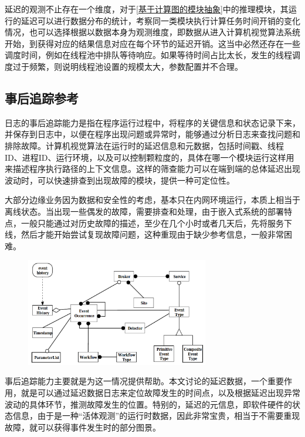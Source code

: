 \documentclass[master]{shtthesis}
\begin{document}
延迟的观测不止存在一个维度，对于\ref{基于计算图的模块抽象}中的推理模块，其运行的延迟可以进行数据分布的统计，考察同一类模块执行计算任务时间开销的变化情况，也可以选择根据以数据本身为观测维度，即数据从进入计算机视觉算法系统开始，到获得对应的结果信息对应在每个环节的延迟开销。这当中必然还存在一些调度时间，例如在线程池中排队等待响应。如果等待时间占比太长，发生的线程调度过于频繁，则说明线程池设置的规模太大，参数配置并不合理。

\subsection{事后追踪参考}\label{事后追踪参考}
日志的事后追踪能力是指在程序运行过程中，将程序的关键信息和状态记录下来，并保存到日志中，以便在程序出现问题或异常时，能够通过分析日志来查找问题和排除故障。计算机视觉算法在运行时的延迟信息和元数据，包括时间戳、线程ID、进程ID、运行环境，以及可以控制颗粒度的，具体在哪一个模块运行这样用来描述程序执行路径的上下文信息。这样的筛查能力可以在端到端的总体延迟出现波动时，可以快速排查到出现故障的模块，提供一种可定位性。

大部分边缘业务因为数据和安全性的考虑，基本只在内网环境运行，本质上相当于离线状态。当出现一些偶发的故障，需要排查和处理，由于嵌入式系统的部署特点，一般只能通过对历史故障的描述，至少在几个小时或者几天后，先将服务下线，然后才能开始尝试复现故障问题，这种重现由于缺少参考信息，一般非常困难。

\begin{figure}[htbp]
	\centering
	\includegraphics[width=8cm]{img/eve.png}
	\label{一种日志事件跟踪的设计方法}
\end{figure}

事后追踪能力主要就是为这一情况提供帮助。本文讨论的延迟数据，一个重要作用，就是可以通过延迟数据日志来定位故障发生的时间点，以及根据延迟出现异常波动的具体环节，推测故障发生的位置\cite{geppert1997logging}。特别的，延迟的元信息，即软件硬件的状态信息，由于是一种“活体观测”的运行时数据，因此非常宝贵，相当于不需要重现故障，就可以获得事件发生时的部分图景。
\end{document}
